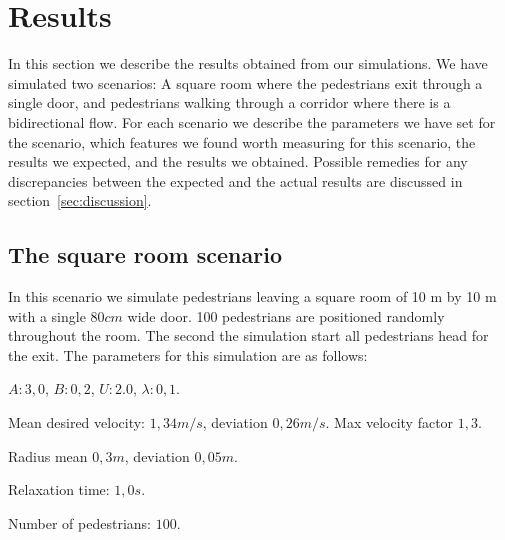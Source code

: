 \section{Results}
\label{sec:results}
In this section we describe the results obtained from our simulations. We have simulated two scenarios: A square room where the pedestrians exit through a single door, and pedestrians walking through a corridor where there is a bidirectional flow. For each scenario we describe the parameters we have set for the scenario, which features we found worth measuring for this scenario, the results we expected, and the results we obtained. Possible remedies for any discrepancies between the expected and the actual results are discussed in section~\ref{sec:discussion}.

\subsection{The square room scenario}
In this scenario we simulate pedestrians leaving a square room of 10 m by 10 m with a single $80cm$ wide door. 100 pedestrians are positioned randomly throughout the room. The second the simulation start all pedestrians head for the exit. The parameters for this simulation are as follows:
\begin{itemize*}
    \item $A: 3,0$, $B: 0,2$, $U: 2.0$, $\lambda: 0,1$.
    \item Mean desired velocity: $1,34 m/s$, deviation $0,26 m/s$. Max velocity factor $1,3$.
    \item Radius mean $0,3 m$, deviation $0,05 m$.
    \item Relaxation time: $1,0 s$.
    \item Number of pedestrians: $100$.
\end{itemize*}

